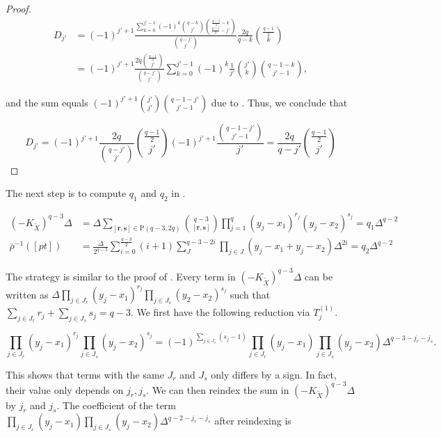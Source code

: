 \documentclass[11pt]{article}
\begin{document}
\begin{proof}
    \begin{align*}
        D_{j'} &= (-1)^{j'+1}\frac{\sum\limits_{k = 0}^{j' - 1}(-1)^k\binom{q-k}{j'}\binom{\frac{q-1}{2}-k}{\frac{q-1}{2}-j'}}{\binom{q-j'}{j'}}\frac{2q}{q-k}\binom{\frac{q-1}{2}}{k}\\  
        &=(-1)^{j'+1}\frac{2q\binom{\frac{q-1}{2}}{j'}}{\binom{q-j'}{j'}}\sum_{k = 0}^{j' - 1}(-1)^k\frac{1}{j'}\binom{j'}{k}\binom{q-1-k}{j'-1},
    \end{align*}

    and the sum equals \((-1)^{j'+1}\binom{j'}{j'}\binom{q-1-j'}{j'-1}\) due to . Thus, we conclude that 
    
    \[
    D_{j'} = (-1)^{j'+1}\frac{2q}{\binom{q-j'}{j'}}\binom{\frac{q-1}{2}}{j'}(-1)^{j'+1}\frac{\binom{q-1-j'}{j'-1}}{j'} = \frac{2q}{q-j'}\binom{\frac{q-1}{2}}{j'}
    \]

\end{proof}

The next step is to compute \(q_1\) and \(q_2\) in . 

\begin{align*}
    (-K_{\tilde{X}})^{q-3}\Delta &= \Delta\sum_{[\mathbf{r}, \mathbf{s}]\in \mathrm{P}(q-3,2q)}\binom{q-3}{[\mathbf{r}, \mathbf{s}]}\prod_{j = 1}^q(y_j - x_1)^{r_j}(y_j - x_2)^{s_j} = q_1\Delta^{q-2}\\ 
    \bar{\rho}^{-1}([pt]) &= \frac{\Delta}{2^{q-3}}\sum_{i = 0}^{\frac{q-3}{2}}(i+1)\sum_J^{q-3-2i}\prod_{j\in J}(y_j - x_1 + y_j - x_2)\Delta^{2i} = q_2\Delta^{q-2}
\end{align*}

The strategy is similar to the proof of . Every term in \((-K_{\tilde{X}})^{q-3}\Delta\) can be written as \(\Delta\prod_{j\in J_r}(y_j - x_1)^{r_j}\prod_{j\in J_s}(y_2 - x_2)^{s_j}\) such that \(\sum_{j\in J_r}r_j + \sum_{j\in J_s}s_j = q-3\). We first have the following reduction via \(T_j^{(1)}\). 

\[
\prod_{j\in J_r}(y_j - x_1)^{r_j}\prod_{j\in J_s}(y_j - x_2)^{s_j}=(-1)^{\sum_{j\in J_s} (s_j - 1)}\prod_{j\in J_r}(y_j - x_1)\prod_{j\in J_s}(y_j - x_2)\Delta^{q-3-j_r-j_s}.
\]

This shows that terms with the same \(J_r\) and \(J_s\) only differs by a sign. In fact, their value only depends on \(j_r, j_s\). We can then reindex the sum in \((-K_{\tilde{X}})^{q-3}\Delta\) by \(j_r\) and \(j_s\). The coefficient of the term \(\prod_{j\in J_r}(y_j - x_1)\prod_{j\in J_s}(y_j - x_2)\Delta^{q-2-j_r-j_s}\) after reindexing is 
\end{document}
